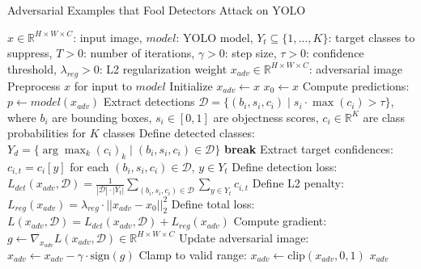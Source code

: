 \documentclass[../main.tex]{subfiles}
\begin{document}
\begin{breakablealgorithm}{Adversarial Examples that Fool Detectors Attack on YOLO}
\begin{algorithmic}[1]
\Require $x \in \mathbb{R}^{H \times W \times C}$: input image, $model$: YOLO model, $Y_t \subseteq \{1, \dots, K\}$: target classes to suppress, $T > 0$: number of iterations, $\gamma > 0$: step size, $\tau > 0$: confidence threshold, $\lambda_{reg} > 0$: L2 regularization weight
\Ensure $x_{adv} \in \mathbb{R}^{H \times W \times C}$: adversarial image
\State Preprocess $x$ for input to $model$ 
\State Initialize $x_{adv} \gets x$ 
\State $x_0 \gets x$ 
    \State Compute predictions: $p \gets model(x_{adv})$ 
    \State Extract detections $\mathcal{D} = \{ (b_i, s_i, c_i) \mid s_i \cdot \max(c_i) > \tau \}$, where $b_i$ are bounding boxes, $s_i \in [0, 1]$ are objectness scores, $c_i \in \mathbb{R}^K$ are class probabilities for $K$ classes
    \State Define detected classes: $Y_d = \{ \arg\max_k (c_i)_k \mid (b_i, s_i, c_i) \in \mathcal{D} \}$
        \State \textbf{break} 
    \EndIf
    \State Extract target confidences: $c_{i,t} = c_i[y]$ for each $(b_i, s_i, c_i) \in \mathcal{D}$, $y \in Y_t$
    \State Define detection loss: $L_{det}(x_{adv}, \mathcal{D}) = \frac{1}{|\mathcal{D}| \cdot |Y_t|} \sum_{(b_i, s_i, c_i) \in \mathcal{D}} \sum_{y \in Y_t} c_{i,t}$ 
    \State Define L2 penalty: $L_{reg}(x_{adv}) = \lambda_{reg} \cdot ||x_{adv} - x_0||_2^2$ 
    \State Define total loss: $L(x_{adv}, \mathcal{D}) = L_{det}(x_{adv}, \mathcal{D}) + L_{reg}(x_{adv})$
    \State Compute gradient: $g \gets \nabla_{x_{adv}} L(x_{adv}, \mathcal{D}) \in \mathbb{R}^{H \times W \times C}$ 
    \State Update adversarial image: $x_{adv} \gets x_{adv} - \gamma \cdot \text{sign}(g)$ 
    \State Clamp to valid range: $x_{adv} \gets \text{clip}(x_{adv}, 0, 1)$ 
\EndFor
\State \Return $x_{adv}$ 
\end{algorithmic}
\end{breakablealgorithm}
\end{document}
